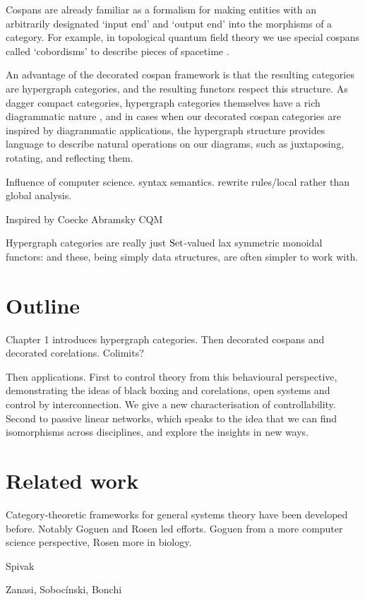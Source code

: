 Cospans are already familiar as a formalism for making entities with an
arbitrarily designated `input end' and `output end' into the morphisms of a
category.  For example, in topological quantum field theory we use special
cospans called `cobordisms' to describe pieces of spacetime \cite{BL,BaezStay}.

An advantage of the decorated cospan framework is that the resulting categories
are hypergraph categories, and the resulting functors respect this structure.
As dagger compact categories, hypergraph categories themselves have a rich
diagrammatic nature \cite{Se}, and in cases when our decorated cospan categories
are inspired by diagrammatic applications, the hypergraph structure provides
language to describe natural operations on our diagrams, such as juxtaposing,
rotating, and reflecting them.

Influence of computer science. syntax semantics. rewrite rules/local rather than
global analysis.

Inspired by Coecke Abramsky CQM

Hypergraph categories are really just $\mathrm{Set}$-valued lax symmetric monoidal
functors: and these, being simply data structures, are often simpler to work
with.

\section{Outline}
Chapter 1 introduces hypergraph categories. Then decorated cospans and decorated
corelations. Colimits?

Then applications. First to control theory from this behavioural perspective,
demonstrating the ideas of black boxing and corelations, open systems and
control by interconnection. We give a new characterisation of controllability.
Second to passive linear networks, which speaks to the idea that we can find
isomorphisms across disciplines, and explore the insights in new ways.

\section{Related work}

Category-theoretic frameworks for general systems theory have been developed
before. Notably Goguen and Rosen led efforts. Goguen from a more computer
science perspective, Rosen more in biology.



Spivak 

Zanasi, Soboc\'inski, Bonchi

